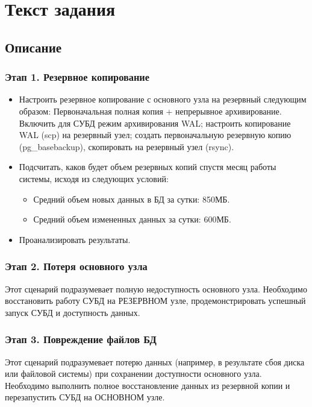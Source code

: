 \documentclass{article}
\begin{document}
\section{Текст задания}

\subsection{Описание}

\subsubsection{Этап 1. Резервное копирование}
        \begin{itemize}
            \item Настроить резервное копирование с основного узла на резервный следующим образом: Первоначальная полная копия + непрерывное архивирование. Включить для СУБД режим архивирования WAL; настроить копирование WAL (scp) на резервный узел; создать первоначальную резервную копию (pg\_basebackup), скопировать на резервный узел (rsync).
            \item Подсчитать, каков будет объем резервных копий спустя месяц работы системы, исходя из следующих условий:
                \begin{itemize}
                    \item Средний объем новых данных в БД за сутки: 850МБ.
                    \item Средний объем измененных данных за сутки: 600МБ.
                \end{itemize}
            \item Проанализировать результаты.
        \end{itemize}
\subsubsection{Этап 2. Потеря основного узла}
Этот сценарий подразумевает полную недоступность основного узла. Необходимо восстановить работу СУБД на РЕЗЕРВНОМ узле, продемонстрировать успешный запуск СУБД и доступность данных.

\subsubsection{Этап 3. Повреждение файлов БД}
Этот сценарий подразумевает потерю данных (например, в результате сбоя диска или файловой системы) при сохранении доступности основного узла. Необходимо выполнить полное восстановление данных из резервной копии и перезапустить СУБД на ОСНОВНОМ узле.
\end{document}
